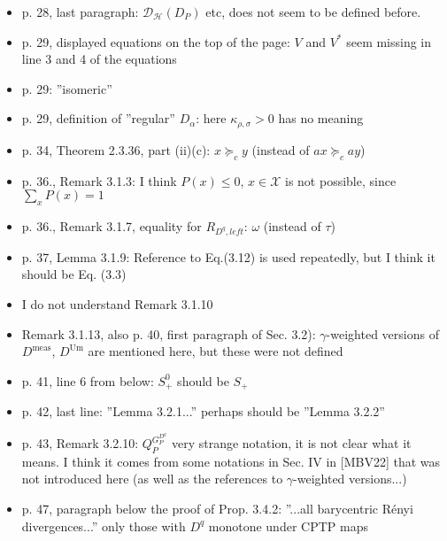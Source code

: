 \documentclass[12pt]{article}
\begin{document}
\begin{itemize}
\item p. 28, last paragraph: $\mathcal D_{\mathcal H}(D_P)$ etc, does not seem to be defined before. 



\item p. 29, displayed equations on the top of the page: $V$ and $V^*$ seem missing in
line 3 and 4 of the equations

\item p. 29: ''isomeric''

\item p. 29, definition of ''regular'' $D_\alpha$: here $\kappa_{\rho,\sigma}>0$ has no
meaning

\item p. 34, Theorem 2.3.36, part (ii)(c): $x\succcurlyeq_c y$ (instead of
$ax\succcurlyeq_c ay$)

\item p. 36., Remark 3.1.3: I think $P(x)\le 0$, $x\in \mathcal X$ is not possible, since
$\sum_xP(x)=1$

\item p. 36., Remark 3.1.7, equality for $R_{D^q,left}$: $\omega$ (instead of $\tau$)

\item p. 37, Lemma 3.1.9: Reference to Eq.(3.12) is used repeatedly, but I think it should
be Eq. (3.3)

\item I do not understand Remark 3.1.10

\item Remark 3.1.13, also p. 40, first paragraph of Sec. 3.2): $\gamma$-weighted versions of $D^{\text{meas}}$, $D^{\text{Um}}$ are
mentioned here, but these were not 
defined

\item p. 41, line 6 from below: $S^0_+$ should be $S_+$

\item p. 42, last line: ''Lemma 3.2.1...'' perhaps should be ''Lemma 3.2.2''

\item p. 43, Remark 3.2.10: $Q_P^{G_P^{D^q}}$ very strange notation, it is not clear what
it means. I think it comes from some notations in Sec. IV in [MBV22] that was not
introduced here (as well as the references to $\gamma$-weighted versions...)

\item p. 47, paragraph below the proof of Prop. 3.4.2: ''...all barycentric R\'enyi
divergences...'' only those with $D^q$ monotone under CPTP maps


\end{itemize}
\end{document}
